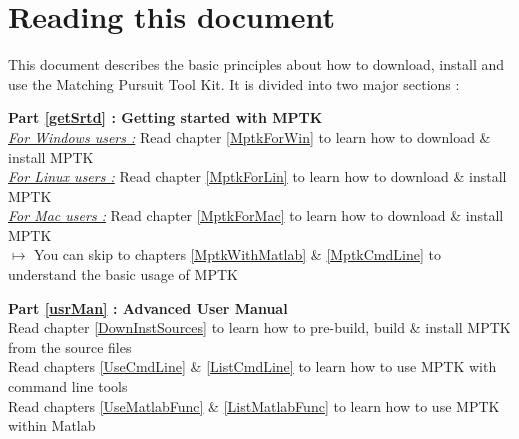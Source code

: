 \section{Reading this document}

This document describes the basic principles about how to download, install and use the Matching Pursuit Tool Kit. 
It is divided into two major sections : 

\begin{my_itemize}
	\item \textbf{\large Part \ref{getSrtd} : Getting started with MPTK}\\
		\underline{\emph{For Windows users :}} Read chapter \ref{MptkForWin} to learn how to download \& install MPTK\\
		\underline{\emph{For Linux users :}} Read chapter \ref{MptkForLin} to learn how to download \& install MPTK\\
		\underline{\emph{For Mac users :}} Read chapter \ref{MptkForMac} to learn how to download \& install MPTK\\
		$\mapsto$ You can skip to chapters \ref{MptkWithMatlab} \& \ref{MptkCmdLine} to understand the basic usage of MPTK
	\item \textbf{\large Part \ref{usrMan} : Advanced User Manual}\\
		Read chapter \ref{DownInstSources} to learn how to pre-build, build \& install MPTK from the source files\\
		Read chapters \ref{UseCmdLine} \& \ref{ListCmdLine} to learn how to use MPTK with command line tools\\
		Read chapters \ref{UseMatlabFunc} \& \ref{ListMatlabFunc} to learn how to use MPTK within Matlab
\end{my_itemize}

\clearpage